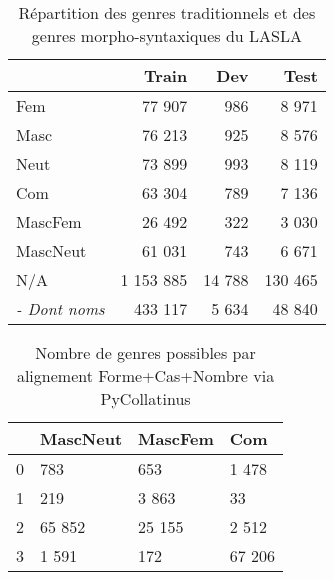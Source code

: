 \begin{table}[]
\centering
\begin{tabular}{l|rrr}
\toprule
           & Train   & Dev   & Test   \\ \midrule
Fem        & 77 907   & 986   & 8 971   \\
Masc       & 76 213   & 925   & 8 576   \\
Neut       & 73 899   & 993   & 8 119   \\
Com        & 63 304   & 789   & 7 136   \\
MascFem    & 26 492   & 322   & 3 030   \\
MascNeut   & 61 031   & 743   & 6 671   \\
N/A        & 1 153 885 & 14 788 & 130 465 \\
\textit{- Dont noms} & 433 117  & 5 634  & 48 840  \\ \bottomrule
\end{tabular}
\label{table:lasla:genders-par-corpus}
\caption{Répartition des genres traditionnels et des genres morpho-syntaxiques du LASLA}
\end{table}


\begin{table}[]
\centering
\begin{tabular}{l|lll}
\toprule
         & MascNeut & MascFem & Com    \\ \midrule
0        & 783      & 653     & 1 478  \\
1        & 219      & 3 863   & 33     \\
2        & 65 852   & 25 155  & 2 512  \\
3        & 1 591    & 172     & 67 206 \\ \bottomrule
\end{tabular}
\label{table:lasla:genders-alignement}
\caption{Nombre de genres possibles par alignement Forme+Cas+Nombre via PyCollatinus}
\end{table}

\newpara

